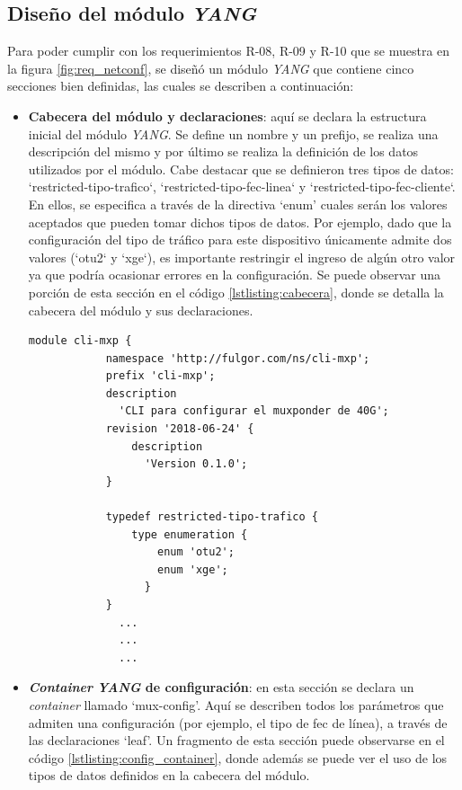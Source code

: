 \subsection{Diseño del módulo \textit{YANG}}

Para poder cumplir con los requerimientos R-08, R-09 y R-10 que se muestra en la figura \ref{fig:req_netconf}, se diseñó un módulo \textit{YANG} que contiene cinco secciones bien definidas, las cuales se describen a continuación: 

\begin{itemize}
	\item \textbf{Cabecera del módulo y declaraciones}: aquí se declara la estructura inicial del módulo \textit{YANG}. Se define un nombre y un prefijo, se realiza una descripción del mismo y por último se realiza la definición de los datos utilizados por el módulo. Cabe destacar que se definieron tres tipos de datos: ‘restricted-tipo-trafico‘, ‘restricted-tipo-fec-linea‘ y ‘restricted-tipo-fec-cliente‘. En ellos, se especifica a través de la directiva ‘enum’ cuales serán los valores aceptados que pueden tomar dichos tipos de datos. Por ejemplo, dado que la configuración del tipo de tráfico para este dispositivo únicamente admite dos valores (‘otu2‘ y ‘xge‘), es importante restringir el ingreso de algún otro valor ya que podría ocasionar errores en la configuración. Se puede observar una porción de esta sección en el código \ref{lstlisting:cabecera}, donde se detalla la cabecera del módulo y sus declaraciones.  

  \newpage
    \begin{lstlisting}[language=SHELXL, caption=Cabecera del módulo \textit{YANG}., label=lstlisting:cabecera]
        module cli-mxp {
            namespace 'http://fulgor.com/ns/cli-mxp';
            prefix 'cli-mxp';
            description
              'CLI para configurar el muxponder de 40G';
            revision '2018-06-24' {
                description
                  'Version 0.1.0';
            }

            typedef restricted-tipo-trafico {
                type enumeration {
                    enum 'otu2';
                    enum 'xge';
                  }
            }
              ...
              ...
              ...

    \end{lstlisting}

    \item \textbf{\textit{Container} \textit{YANG} de configuración}: en esta sección se declara un \textit{container} llamado ‘mux-config’. Aquí se describen todos los parámetros que admiten una configuración (por ejemplo, el tipo de fec de línea), a través de las declaraciones ‘leaf’. Un fragmento de esta sección puede observarse en el código \ref{lstlisting:config_container}, donde además se puede ver el uso de los tipos de datos definidos en la cabecera del módulo.
  

\end{itemize}
